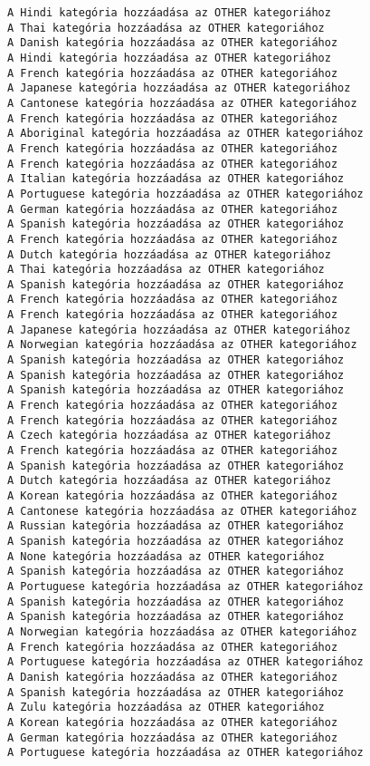 \documentclass[11pt]{article}
\begin{document}
\begin{Verbatim}[commandchars=\\\{\}]
A Hindi kategória hozzáadása az OTHER kategoriához
A Thai kategória hozzáadása az OTHER kategoriához
A Danish kategória hozzáadása az OTHER kategoriához
A Hindi kategória hozzáadása az OTHER kategoriához
A French kategória hozzáadása az OTHER kategoriához
A Japanese kategória hozzáadása az OTHER kategoriához
A Cantonese kategória hozzáadása az OTHER kategoriához
A French kategória hozzáadása az OTHER kategoriához
A Aboriginal kategória hozzáadása az OTHER kategoriához
A French kategória hozzáadása az OTHER kategoriához
A French kategória hozzáadása az OTHER kategoriához
A Italian kategória hozzáadása az OTHER kategoriához
A Portuguese kategória hozzáadása az OTHER kategoriához
A German kategória hozzáadása az OTHER kategoriához
A Spanish kategória hozzáadása az OTHER kategoriához
A French kategória hozzáadása az OTHER kategoriához
A Dutch kategória hozzáadása az OTHER kategoriához
A Thai kategória hozzáadása az OTHER kategoriához
A Spanish kategória hozzáadása az OTHER kategoriához
A French kategória hozzáadása az OTHER kategoriához
A French kategória hozzáadása az OTHER kategoriához
A Japanese kategória hozzáadása az OTHER kategoriához
A Norwegian kategória hozzáadása az OTHER kategoriához
A Spanish kategória hozzáadása az OTHER kategoriához
A Spanish kategória hozzáadása az OTHER kategoriához
A Spanish kategória hozzáadása az OTHER kategoriához
A French kategória hozzáadása az OTHER kategoriához
A French kategória hozzáadása az OTHER kategoriához
A Czech kategória hozzáadása az OTHER kategoriához
A French kategória hozzáadása az OTHER kategoriához
A Spanish kategória hozzáadása az OTHER kategoriához
A Dutch kategória hozzáadása az OTHER kategoriához
A Korean kategória hozzáadása az OTHER kategoriához
A Cantonese kategória hozzáadása az OTHER kategoriához
A Russian kategória hozzáadása az OTHER kategoriához
A Spanish kategória hozzáadása az OTHER kategoriához
A None kategória hozzáadása az OTHER kategoriához
A Spanish kategória hozzáadása az OTHER kategoriához
A Portuguese kategória hozzáadása az OTHER kategoriához
A Spanish kategória hozzáadása az OTHER kategoriához
A Spanish kategória hozzáadása az OTHER kategoriához
A Norwegian kategória hozzáadása az OTHER kategoriához
A French kategória hozzáadása az OTHER kategoriához
A Portuguese kategória hozzáadása az OTHER kategoriához
A Danish kategória hozzáadása az OTHER kategoriához
A Spanish kategória hozzáadása az OTHER kategoriához
A Zulu kategória hozzáadása az OTHER kategoriához
A Korean kategória hozzáadása az OTHER kategoriához
A German kategória hozzáadása az OTHER kategoriához
A Portuguese kategória hozzáadása az OTHER kategoriához

\end{Verbatim}
\end{document}
